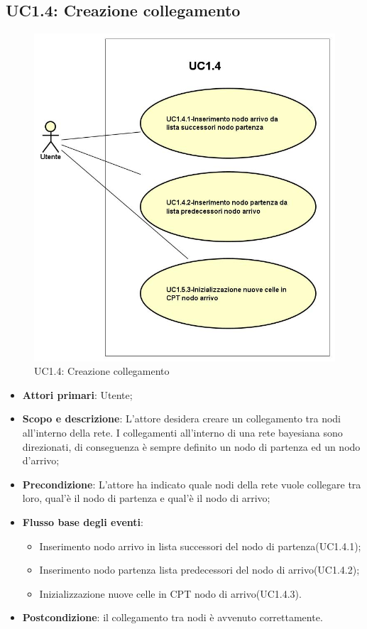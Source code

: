 \subsection{UC1.4: Creazione collegamento} 
\begin{figure} [H]
	\centering
	\includegraphics[scale=0.45]{Img/UC1-4} 
	\caption{UC1.4: Creazione collegamento} \label{} 
\end{figure} 
\begin{itemize} 
	\item{\textbf{Attori primari}: Utente;} 
	\item{\textbf{Scopo e descrizione}: L'attore desidera creare un collegamento tra nodi all'interno della rete. I collegamenti all'interno di una rete bayesiana sono direzionati, di conseguenza è sempre definito un nodo di partenza ed un nodo d'arrivo;} 
	\item{\textbf{Precondizione}: L'attore ha indicato quale nodi della rete vuole collegare tra loro, qual'è il nodo di partenza e qual'è il nodo di arrivo;} 
	\item{\textbf{Flusso base degli eventi}: } 
	\begin{itemize} 
		\item{Inserimento nodo arrivo in lista successori del nodo di partenza(UC1.4.1);} 
		\item{Inserimento nodo partenza lista predecessori del nodo di arrivo(UC1.4.2);} 
		\item{Inizializzazione nuove celle in CPT nodo di arrivo(UC1.4.3).} 
	\end{itemize} 
	\item{\textbf{Postcondizione}: il collegamento tra nodi è avvenuto correttamente.} 
\end{itemize} 
